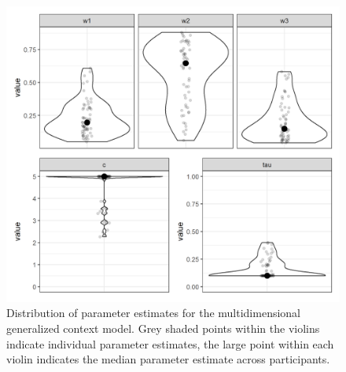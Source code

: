 \documentclass[a4paper,man,natbib]{apa6}
\begin{document}
\begin{figure}[htbp]
\centering
\includegraphics[width = \textwidth]{fig_par_multidim.png}
\caption{Distribution of parameter estimates for the multidimensional generalized context model. Grey shaded points within the violins indicate individual parameter estimates, the large point within each violin indicates the median parameter estimate across participants.}
\label{fig:par_multidim}
\end{figure}
\end{document}
